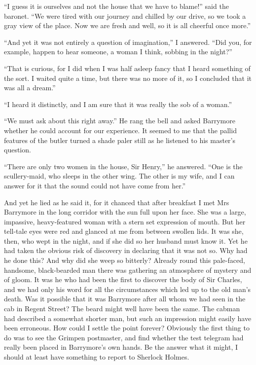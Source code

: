 \documentclass[paper=5.5in:8.5in,BCOR=7mm,twoside,DIV=calc,12pt,usegeometry,openany,chapterprefix,endperiod]{scrbook} %
\begin{document}
\enquote{I guess it is ourselves and not the house that we have to blame!} said the baronet. \enquote{We were tired with our journey and chilled by our drive, so we took a gray view of the place. Now we are fresh and well, so it is all cheerful once more.}

\enquote{And yet it was not entirely a question of imagination,} I an\-swered. \enquote{Did you, for example, happen to hear someone, a woman I think, sobbing in the night?}

\enquote{That is curious, for I did when I was half asleep fancy that I heard something of the sort. I waited quite a time, but there was no more of it, so I concluded that it was all a dream.}

\enquote{I heard it distinctly, and I am sure that it was really the sob of a woman.}

\enquote{We must ask about this right away.} He rang the bell and asked Barrymore whether he could account for our experience. It seemed to me that the pallid features of the butler turned a shade paler still as he listened to his master's question.

\enquote{There are only two women in the house, Sir Henry,} he an\-swered. \enquote{One is the scullery-maid, who sleeps in the other wing. The other is my wife, and I can answer for it that the sound could not have come from her.}

And yet he lied as he said it, for it chanced that after breakfast I met Mrs Barrymore in the long corridor with the sun full upon her face. She was a large, impassive, heavy-featured woman with a stern set expression of mouth. But her tell-tale eyes were red and glanced at me from between swollen lids. It was she, then, who wept in the night, and if she did so her husband must know it. Yet he had taken the obvious risk of discovery in declaring that it was not so. Why had he done this? And why did she weep so bitterly? Already round this pale-faced, handsome, black-bearded man there was gathering an atmosphere of mystery and of gloom. It was he who had been the first to discover the body of Sir Charles, and we had only his word for all the circumstances which led up to the old man's death. Was it possible that it was Barrymore after all whom we had seen in the cab in Regent Street? The beard might well have been the same. The cabman had described a somewhat shorter man, but such an impression might easily have been erroneous. How could I settle the point forever? Obviously the first thing to do was to see the Grimpen postmaster, and find whether the test telegram had really been placed in Barrymore's own hands. Be the answer what it might, I should at least have something to report to Sherlock Holmes.
\end{document}
